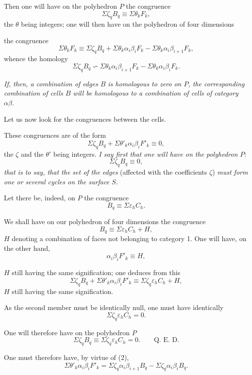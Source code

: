 \documentclass{article}
\begin{document}
Then one will have on the polyhedron $P$ the congruence
\[ \Sigma \zeta_{q} B_{q} \equiv \Sigma \theta_{k} F_{k}, \]
the $\theta$ being integers; one will then have on the polyhedron of four dimensions

the congruence
\[ \Sigma \theta_{k} F_{k} \equiv \Sigma \zeta_{q} B_{q} + \Sigma \theta_{k} \alpha_{i}\beta_{i}F_{k} - \Sigma \theta_{k} \alpha_{i}\beta_{i+1}F_{k}, \]
whence the homology
\[ \Sigma \zeta_{q} B_{q} \backsim \Sigma \theta_{k} \alpha_{i}\beta_{i+1}F_{k} - \Sigma \theta_{k} \alpha_{i}\beta_{i}F_{k}. \]

\emph{If, then, a combination of edges $B$ is homologous to zero on $P$, the corresponding combination of cells $B$ will be homologous to a combination of cells of category $\alpha\beta$}.

Let us now look for the congruences between the cells.

These congruences are of the form
\[ \Sigma \zeta_{q} B_{q} + \Sigma \theta'_{k} \alpha_{i}\beta_{i}F'_{k} \equiv 0, \tag{2} \]
the $\zeta$ and the $\theta'$ being integers. \emph{I say first that one will have on the polyhedron $P$}:
\[ \Sigma \zeta_{q} B_{q} \equiv 0, \]
\emph{that is to say, that the set of the edges} (affected with the coefficients $\zeta$) \emph{must form one or several cycles on the surface $S$}.

Let there be, indeed, on $P$ the congruence
\[ B_{q} \equiv \Sigma \varepsilon_{h} C_{h}. \]

We shall have on our polyhedron of four dimensions the congruence
\[ B_{q} \equiv \Sigma \varepsilon_{h} C_{h} + H, \]
$H$ denoting a combination of faces not belonging to category 1. One will have, on the other hand,
\[ \alpha_{i}\beta_{i}F'_{k} \equiv H, \]

$H$ still having the same signification; one deduces from this
\[ \Sigma \zeta_{q} B_{q} + \Sigma \theta'_{k} \alpha_{i}\beta_{i}F'_{k} \equiv \Sigma \zeta_{q} \varepsilon_{h} C_{h} + H, \]
$H$ still having the same signification.

As the second member must be identically null, one must have identically
\[ \Sigma \zeta_{q} \varepsilon_{h} C_{h} = 0. \]

One will therefore have on the polyhedron $P$
\[ \Sigma \zeta_{q} B_{q} \equiv \Sigma \zeta_{q} \varepsilon_{h} C_{h} = 0. \qquad \text{Q.~E.~D.} \tag{3} \]

One must therefore have, by virtue of (2),
\[ \Sigma \theta'_{k} \alpha_{i}\beta_{i}F'_{k} = \Sigma \zeta_{q} \alpha_{i}\beta_{i+1}B_{q} - \Sigma \zeta_{q} \alpha_{i}\beta_{i}B_{q}. \tag{4} \]
\end{document}
